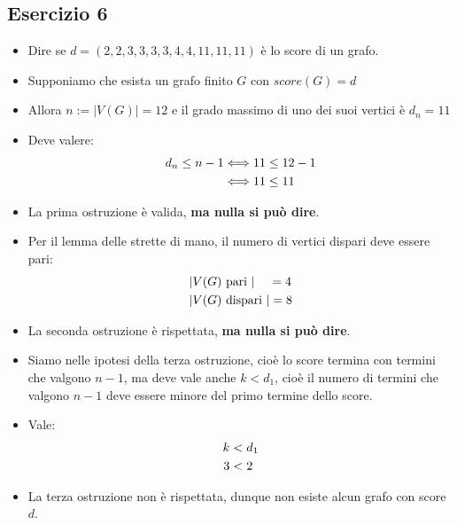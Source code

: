 \documentclass[10pt]{article}
\begin{document}
	\subsection{Esercizio 6}
	\begin{itemize}
	\item
	Dire se $d = (2,2,3,3,3,3,4,4,11,11,11)$ è lo score di un grafo.
	\item
	Supponiamo che esista un grafo finito $G$ con $score(G) = d$
	\item
	Allora $n := |V(G)| = 12$ e il grado massimo di uno dei suoi vertici è $d_n = 11$
	\item
	Deve valere:
	\begin{equation}
	\begin{split}
		d_n \leq n - 1 &\Longleftrightarrow 11 \leq 12 - 1  \\
		&\Longleftrightarrow 11 \leq 11
		\notag
		\end{split}
	\end{equation}
	\item
	La prima ostruzione è valida, \textbf{ma nulla si può dire}.
	\item
	Per il lemma delle strette di mano, il numero di vertici dispari deve essere pari:
	\begin{equation}
	\begin{split}
		|&V(G) \textrm{ pari }| \quad\, =  4\\
		|&V(G) \textrm{ dispari }| = 8 
		\notag
		\end{split}
	\end{equation}
	\item
	La seconda ostruzione è rispettata, \textbf{ma nulla si può dire}.
	\item
	Siamo nelle ipotesi della terza ostruzione, cioè lo score termina con termini che valgono $n-1$, ma deve vale anche $k < d_1$, cioè il numero di termini che valgono $n-1$ deve essere minore del primo termine dello score.
	\item
	Vale:
	\begin{equation}
	\begin{split}
		k &< d_1 \\
		3 &< 2
		\notag
		\end{split}
	\end{equation}
	\item
	La terza ostruzione non è rispettata, dunque non esiste alcun grafo con score $d$.
	\end{itemize}
	
\end{document}
